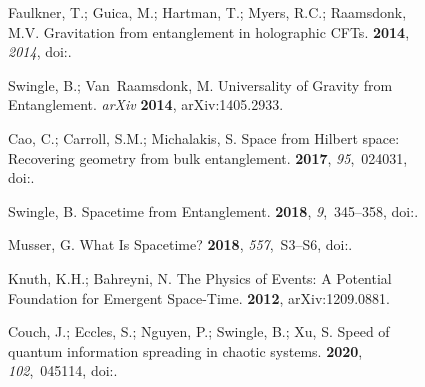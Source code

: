 \documentclass[entropy,article,accept,oneauthor,pdftex]{Definitions/mdpi}
\begin{document}
\begin{figure}[H]
\begin{thebibliography}{999}
Faulkner, T.; Guica, M.; Hartman, T.; Myers, R.C.; Raamsdonk, M.V.
\newblock Gravitation from entanglement in holographic {CFTs}.
 {\bf 2014}, {\em 2014}, doi:{\href{https://doi.org/10.1007/jhep03(2014)051}{}}.

Swingle, B.; Van~Raamsdonk, M.
\newblock Universality of Gravity from Entanglement. \emph{arXiv} \textbf{2014}, arXiv:1405.2933.


Cao, C.; Carroll, S.M.; Michalakis, S.
\newblock Space from Hilbert space: Recovering geometry from bulk entanglement.
 {\bf 2017}, {\em 95},~024031, doi:{\href{https://doi.org/10.1103/physrevd.95.024031}{}}.

Swingle, B.
\newblock Spacetime from Entanglement.
 {\bf 2018}, {\em 9},~345--358, doi:{\href{https://doi.org/10.1146/annurev-conmatphys-033117-054219}{}}.

Musser, G.
\newblock What Is Spacetime?
 {\bf 2018}, {\em 557},~S3--S6, doi:{\href{https://doi.org/10.1038/d41586-018-05095-z}{}}.

Knuth, K.H.; Bahreyni, N.
\newblock The Physics of Events: A Potential Foundation for Emergent
  Space-Time.
 {\bf 2012}, arXiv:1209.0881.

Couch, J.; Eccles, S.; Nguyen, P.; Swingle, B.; Xu, S.
\newblock Speed of quantum information spreading in chaotic systems.
 {\bf 2020}, {\em 102},~045114, doi:{\href{https://doi.org/10.1103/physrevb.102.045114}{}}.


\end{thebibliography}
\end{figure}
\end{document}
